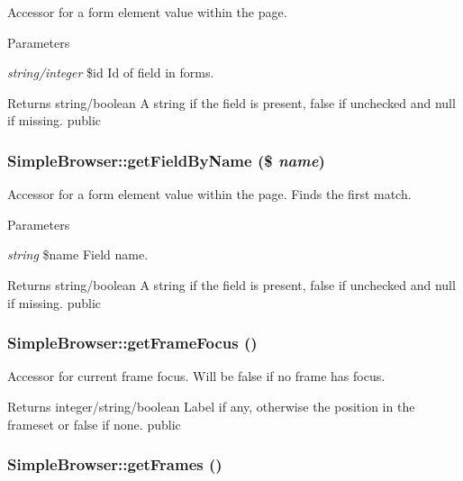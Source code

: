 \label{class_simple_browser_a77372832bd9b64449e958f3af30d4989}
Accessor for a form element value within the page. 
\begin{DoxyParams}{Parameters}
\item[{\em string/integer}]\$id Id of field in forms. \end{DoxyParams}
\begin{DoxyReturn}{Returns}
string/boolean A string if the field is present, false if unchecked and null if missing.  public 
\end{DoxyReturn}
\hypertarget{class_simple_browser_af5369e4063b02b0925f2c49913029085}{
\subsubsection[{getFieldByName}]{\setlength{\rightskip}{0pt plus 5cm}SimpleBrowser::getFieldByName (\$ {\em name})}}
\label{class_simple_browser_af5369e4063b02b0925f2c49913029085}
Accessor for a form element value within the page. Finds the first match. 
\begin{DoxyParams}{Parameters}
\item[{\em string}]\$name Field name. \end{DoxyParams}
\begin{DoxyReturn}{Returns}
string/boolean A string if the field is present, false if unchecked and null if missing.  public 
\end{DoxyReturn}
\hypertarget{class_simple_browser_aff692953670dc5aedc140df66e3570c2}{
\subsubsection[{getFrameFocus}]{\setlength{\rightskip}{0pt plus 5cm}SimpleBrowser::getFrameFocus ()}}
\label{class_simple_browser_aff692953670dc5aedc140df66e3570c2}
Accessor for current frame focus. Will be false if no frame has focus. \begin{DoxyReturn}{Returns}
integer/string/boolean Label if any, otherwise the position in the frameset or false if none.  public 
\end{DoxyReturn}
\hypertarget{class_simple_browser_a07cc18881732a8c404493deb9fdcbb51}{
\subsubsection[{getFrames}]{\setlength{\rightskip}{0pt plus 5cm}SimpleBrowser::getFrames ()}}
